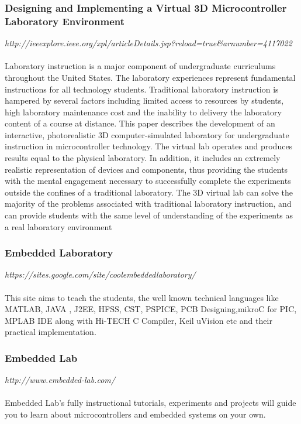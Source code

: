 \documentclass[12pt]{article}
\begin{document}
\subsubsection{Designing and Implementing a Virtual 3D Microcontroller Laboratory Environment}
\textit{http://ieeexplore.ieee.org/xpl/articleDetails.jsp?reload=true&arnumber=4117022}
\\ \hfill \\ 
\noindent
Laboratory instruction is a major component of undergraduate curriculums throughout the United States. The laboratory experiences represent fundamental instructions for all technology students. Traditional laboratory instruction is hampered by several factors including limited access to resources by students, high laboratory maintenance cost and the inability to delivery the laboratory content of a course at distance. This paper describes the development of an interactive, photorealistic 3D computer-simulated laboratory for undergraduate instruction in microcontroller technology. The virtual lab operates and produces results equal to the physical laboratory. In addition, it includes an extremely realistic representation of devices and components, thus providing the students with the mental engagement necessary to successfully complete the experiments outside the confines of a traditional laboratory. The 3D virtual lab can solve the majority of the problems associated with traditional laboratory instruction, and can provide students with the same level of understanding of the experiments as a real laboratory environment


\subsubsection{Embedded Laboratory}
\textit{https://sites.google.com/site/coolembeddedlaboratory/}
\\ \hfill \\
\noindent
This site aims to teach the students, the well known technical languages like  MATLAB, JAVA , J2EE, HFSS, CST, PSPICE, PCB Designing,mikroC for PIC, MPLAB IDE along with Hi-TECH C Compiler, Keil uVision etc and their practical implementation.

\subsubsection{Embedded Lab}
\textit{http://www.embedded-lab.com/}
\\ \hfill \\
\noindent
Embedded Lab's fully instructional tutorials, experiments and projects will guide you to learn about microcontrollers and embedded systems on your own.
\end{document}
